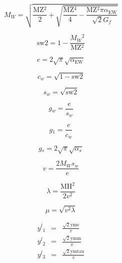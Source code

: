 \begin{equation}
\label{value:15}
M{}_W = 
\sqrt{\frac{\text{MZ}{}^2}{2}+\sqrt{\frac{\text{MZ}{}^4}{4}-\frac{\text{MZ}{}^2 \pi  \alpha {}_{\text{EW}}}{\sqrt{2} G{}_f}}}\end{equation}

\begin{equation}
\label{value:16}
\text{sw2} = 
1-\frac{M{}_W{}^2}{\text{MZ}{}^2}\end{equation}

\begin{equation}
\label{value:17}
e = 
2 \sqrt{\pi } \sqrt{\alpha {}_{\text{EW}}}\end{equation}

\begin{equation}
\label{value:18}
c{}_w = 
\sqrt{1-\text{sw2}}\end{equation}

\begin{equation}
\label{value:19}
s{}_w = 
\sqrt{\text{sw2}}\end{equation}

\begin{equation}
\label{value:20}
g{}_w = 
\frac{e}{s{}_w}\end{equation}

\begin{equation}
\label{value:21}
g{}_1 = 
\frac{e}{c{}_w}\end{equation}

\begin{equation}
\label{value:22}
g{}_s = 
2 \sqrt{\pi } \sqrt{\alpha {}_s}\end{equation}

\begin{equation}
\label{value:23}
v = 
\frac{2 M{}_W s{}_w}{e}\end{equation}

\begin{equation}
\label{value:24}
\lambda = 
\frac{\text{MH}{}^2}{2 v{}^2}\end{equation}

\begin{equation}
\label{value:25}
\mu = 
\sqrt{v{}^2 \lambda }\end{equation}

\begin{equation}
\label{value:26}
\begin{array}{rcl}
y{}^l{}_1 & = & 
\frac{\sqrt{2} \text{yme}}{v}\\
y{}^l{}_2 & = & 
\frac{\sqrt{2} \text{ymm}}{v}\\
y{}^l{}_3 & = & 
\frac{\sqrt{2} \text{ymtau}}{v}\\
\end{array}
\end{equation}

